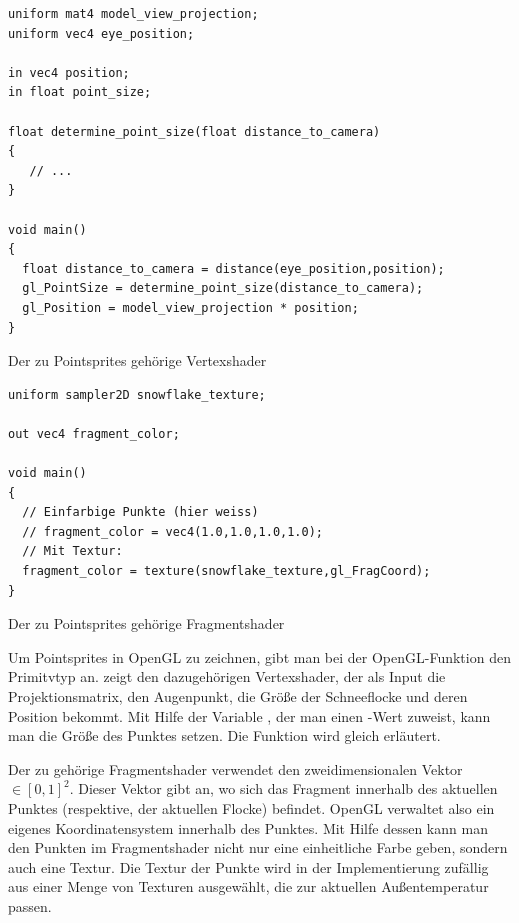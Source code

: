 \begin{listing}
\begin{verbatim}
uniform mat4 model_view_projection;
uniform vec4 eye_position;

in vec4 position;
in float point_size;

float determine_point_size(float distance_to_camera)
{
   // ...
}

void main()
{
  float distance_to_camera = distance(eye_position,position);
  gl_PointSize = determine_point_size(distance_to_camera);
  gl_Position = model_view_projection * position;
}
\end{verbatim}
\caption{Der zu Pointsprites gehörige Vertexshader}
\label{lst:implementation_point_sprite_vertex_shader}
\end{listing}

\begin{listing}
\begin{verbatim}
uniform sampler2D snowflake_texture;

out vec4 fragment_color;

void main()
{
  // Einfarbige Punkte (hier weiss)
  // fragment_color = vec4(1.0,1.0,1.0,1.0);
  // Mit Textur:
  fragment_color = texture(snowflake_texture,gl_FragCoord);
}
\end{verbatim}
\caption{Der zu Pointsprites gehörige Fragmentshader}
\label{lst:implementation_point_sprite_fragment_shader}
\end{listing}

Um Pointsprites in OpenGL zu zeichnen, gibt man bei der OpenGL-Funktion
 den Primitvtyp
an. 
zeigt den dazugehörigen Vertexshader, der als Input die
Projektionsmatrix, den Augenpunkt, die Größe der Schneeflocke und
deren Position bekommt. Mit Hilfe der Variable
, der man einen
-Wert zuweist, kann man die Größe des Punktes
setzen. Die Funktion  wird
gleich erläutert.

Der zu
gehörige Fragmentshader
verwendet den zweidimensionalen Vektor
 $\in [0,1]^2$. Dieser Vektor gibt
an, wo sich das Fragment innerhalb des aktuellen Punktes (respektive,
der aktuellen Flocke) befindet. OpenGL verwaltet also ein eigenes
Koordinatensystem innerhalb des Punktes. Mit Hilfe dessen kann man den
Punkten im Fragmentshader nicht nur eine einheitliche Farbe geben,
sondern auch eine Textur. Die Textur der Punkte wird in der
Implementierung zufällig aus einer Menge von Texturen ausgewählt, die
zur aktuellen Außentemperatur passen.

